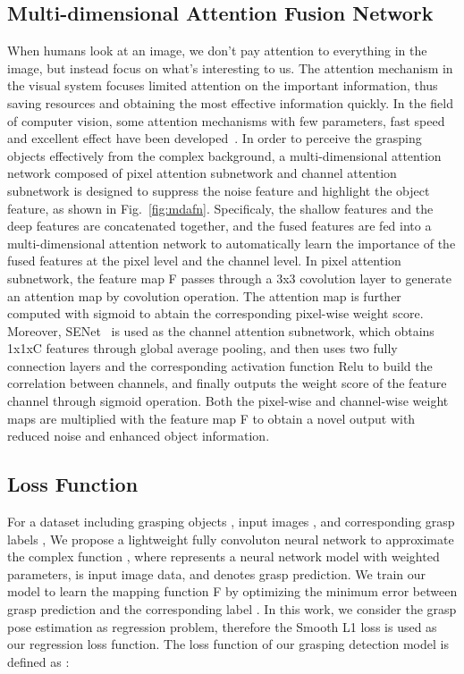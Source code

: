 \documentclass[journal]{IEEEtran}
\begin{document}
\subsection{Multi-dimensional Attention Fusion Network}
\label{sec:MDAFN}
When humans look at an image, we don't pay attention to everything in the image, but instead focus on what's interesting to us. The attention mechanism in the visual system focuses limited attention on the important information, thus saving resources and obtaining the most effective information quickly. In the field of computer vision, some attention mechanisms with few parameters, fast speed and excellent effect have been developed~\cite{nonlocal,senet,cbam,sknet}. In order to perceive the grasping objects effectively from the complex background, a multi-dimensional attention network composed of pixel attention subnetwork and channel attention subnetwork is designed to suppress the noise feature and highlight the object feature, as shown in Fig.~\ref{fig:mdafn}. Specificaly, the shallow features and the deep features are concatenated together, and the fused features are fed into a multi-dimensional attention network to automatically learn the importance of the fused features at  the pixel level and the channel level. In pixel attention subnetwork, the feature map F passes through a 3x3 covolution layer to generate an attention map by covolution operation. The attention map is further computed with sigmoid to abtain the corresponding pixel-wise weight score. Moreover, SENet~\cite{senet} is used as the channel attention subnetwork, which obtains 1x1xC features through global average pooling, and then uses two fully connection layers and the corresponding activation function Relu to build the correlation between channels, and finally outputs the weight score of the feature channel through sigmoid operation. Both the pixel-wise and channel-wise weight maps are multiplied with the feature map F to obtain a novel output with reduced noise and enhanced object information.



\subsection{Loss Function}
For a dataset including grasping objects , input images , and corresponding grasp labels , We propose a lightweight fully convoluton neural network to approximate the complex function , where  represents a neural network model with weighted parameters,  is input image data, and   denotes grasp prediction. We train our model to learn the mapping function F by optimizing the minimum error between grasp prediction  and the corresponding label . In this work, we consider the grasp pose estimation as regression problem, therefore the Smooth L1 loss is used as our regression loss function. The loss function  of our grasping detection model is defined as :
\end{document}
